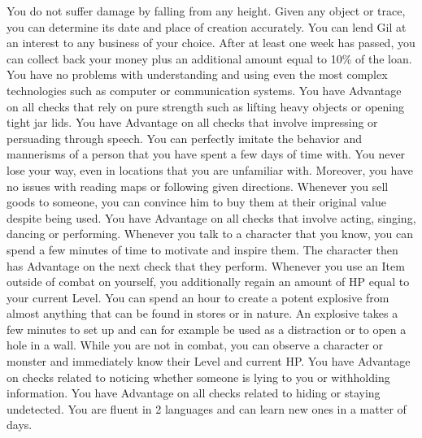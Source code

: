 \newpage
%
{
	You do not suffer damage by falling from any height.
}
\vfill
{} 
{
	Given any object or trace, you can determine its date and place of creation accurately.
}
\vfill
{}
{
	You can lend Gil at an interest to any business of your choice.
	After at least one week has passed, you can collect back your money plus an additional amount equal to 10\% of the loan.
}
\vfill
{}
{
	You have no problems with understanding and using even the most complex technologies such as computer or communication systems.
}
\vfill
{}
{
	You have Advantage on all checks that rely on pure strength such as lifting heavy objects or opening tight jar lids.
}
\vfill
{}
{
	You have Advantage on all checks that involve impressing or persuading through speech. 
}
\vfill
{}
{
	You can perfectly imitate the behavior and mannerisms of a person that you have spent a few days of time with.
}
\vfill
{}
{
	You never lose your way, even in locations that you are unfamiliar with.
	Moreover, you have no issues with reading maps or following given directions. 
}
\vfill
{}
{
	Whenever you sell goods to someone, you can convince him to buy them at their original value despite being used.
}
\vfill
{}
{
	You have Advantage on all checks that involve acting, singing, dancing or performing.
}
\vfill
{}
{
	Whenever you talk to a character that you know, you can spend a few minutes of time to motivate and inspire them.
	The character then has Advantage on the next check that they perform.
}
\vfill
{}
{
	Whenever you use an Item outside of combat on yourself, you additionally regain an amount of HP equal to your current Level. 
}
\vfill
{} {
	You can spend an hour to create a potent explosive from almost anything that can be found in stores or in nature.
	An explosive takes a few minutes to set up and can for example be used as a distraction or to open a hole in a wall.
}
\vfill
{}
{
	While you are not in combat, you can observe a character or monster and immediately know their Level and current HP.
}
\vfill
{}
{
	You have Advantage on checks related to noticing whether someone is lying to you or withholding information.
}
%
\newpage
%
{
	You have Advantage on all checks related to hiding or staying undetected.
}
\vfill
{}
{
	You are fluent in 2 languages and can learn new ones in a matter of days.
}
